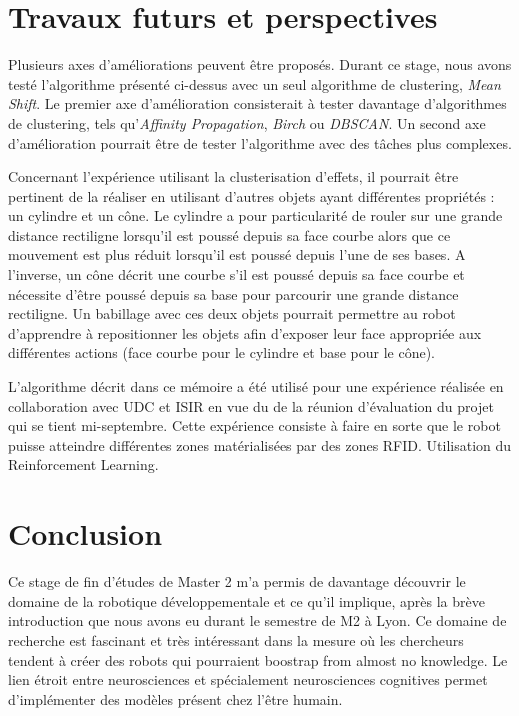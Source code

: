 \documentclass{llncs}
\begin{document}
\section{Travaux futurs et perspectives}

Plusieurs axes d'améliorations peuvent être proposés. Durant ce stage, nous avons testé l'algorithme présenté ci-dessus avec un seul algorithme de clustering, \textit{Mean Shift}. Le premier axe d'amélioration consisterait à tester davantage d'algorithmes de clustering, tels qu'\textit{Affinity Propagation}, \textit{Birch} ou \textit{DBSCAN}. Un second axe d'amélioration pourrait être de tester l'algorithme avec des tâches plus complexes.

Concernant l'expérience utilisant la clusterisation d'effets, il pourrait être pertinent de la réaliser en utilisant d'autres objets ayant différentes propriétés : un cylindre et un cône. Le cylindre a pour particularité de rouler sur une grande distance rectiligne lorsqu'il est poussé depuis sa face courbe alors que ce mouvement est plus réduit lorsqu'il est poussé depuis l'une de ses bases. A l'inverse, un cône décrit une courbe s'il est poussé depuis sa face courbe et nécessite d'être poussé depuis sa base pour parcourir une grande distance rectiligne. Un babillage avec ces deux objets pourrait permettre au robot d'apprendre à repositionner les objets afin d'exposer leur face appropriée aux différentes actions (face courbe pour le cylindre et base pour le cône).

L'algorithme décrit dans ce mémoire a été utilisé pour une expérience réalisée en collaboration avec UDC et ISIR en vue du de la réunion d'évaluation du projet qui se tient mi-septembre. Cette expérience consiste à faire en sorte que le robot puisse atteindre différentes zones matérialisées par des zones RFID. Utilisation du Reinforcement Learning.






\section{Conclusion}

Ce stage de fin d'études de Master 2 m'a permis de davantage découvrir le domaine de la robotique développementale et ce qu'il implique, après la brève introduction que nous avons eu durant le semestre de M2 à Lyon. Ce domaine de recherche est fascinant et très intéressant dans la mesure où les chercheurs tendent à créer des robots qui pourraient boostrap from almost no knowledge. Le lien étroit entre neurosciences et spécialement neurosciences cognitives permet d'implémenter des modèles présent chez l'être humain.
\end{document}
